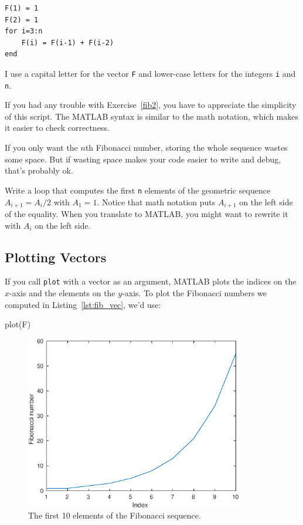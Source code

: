 \begin{lstlisting}[caption={Calculating the Fibonacci sequence using a vector }, label={lst:fib_vec}]
F(1) = 1
F(2) = 1
for i=3:n
    F(i) = F(i-1) + F(i-2)
end
\end{lstlisting}

I use a capital letter for the vector {\tt F}
and lower-case letters for the integers {\tt i} and {\tt n}.

If you had any trouble with Exercise~\ref{fib2}, you have to
appreciate the simplicity of this script.  The MATLAB syntax is
similar to the math notation, which makes it easier to check
correctness.  

If you only want the $n$th Fibonacci number, storing
the whole sequence wastes some space.  But if wasting space
makes your code easier to write and debug, that's probably ok.

\begin{ex}
Write a loop that computes the first {\tt n} elements
of the geometric sequence $A_{i+1} = A_i/2$ with $A_1 = 1$.  Notice that
math notation puts $A_{i+1}$ on the left side of the equality.
When you translate to MATLAB, you might want to rewrite it with
$A_{i}$ on the left side.
\end{ex}


\subsection{Plotting Vectors}


If you call {\tt plot} with a vector as an argument,
MATLAB plots the indices on the $x$-axis and the elements on the
$y$-axis.  To plot the Fibonacci numbers we computed in Listing~\ref{lst:fib_vec}, we'd use:

\begin{code}
plot(F)
\end{code}

\begin{figure}
\centerline{\includegraphics[height=3in]{book/figs/fibonacci.eps}}
\caption{The first 10 elements of the Fibonacci sequence.}
\label{fig:fibonacci}
\end{figure}

